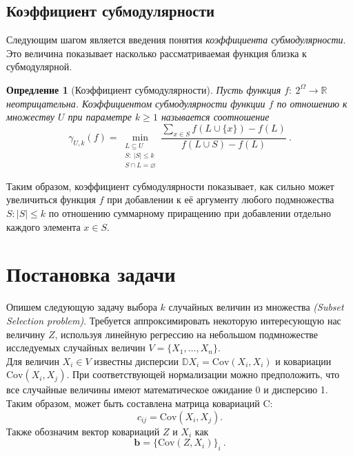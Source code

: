 \documentclass[preprint,12pt]{elsarticle}
\newtheorem{definition}{Опредление}
\newtheorem{theorem}{Теорема}
\begin{document}

\subsection{Коэффициент субмодулярности}

Следующим шагом является введения понятия \textit{коэффициента субмодулярности}. Это величина показывает насколько рассматриваемая функция близка к субмодулярной.  

\begin{definition}[Коэффициент субмодулярности]

Пусть функция $f:~2^\Omega \rightarrow \mathbb{R}$ неотрицательна. Коэффициентом субмодулярности функции $f$ по отношению к множеству $U$ при параметре $k \geqslant 1$ называется соотношение
\[\gamma_{U, k}(f)=\min\limits_{\substack{L\subseteq U \\ 
                                          S:~|S| \leqslant k \\ 
                                          S \cap L=\varnothing}} \frac{\sum\limits_{x \in S} f(L \cup\{x\})-f(L)}{f(L \cup S)-f(L)}~.\]
\end{definition}

Таким образом, коэффициент субмодулярности показывает, как сильно может увеличиться функция $f$ при добавлении к её аргументу любого подмножества $S: |S|\leqslant k$ по отношению суммарному приращению при добавлении отдельно каждого элемента $x \in S$.

\section{Постановка задачи}

\label{S:2}
Опишем следующую задачу выбора $k$ случайных величин из множества \textit{(Subset Selection problem)}. Требуется аппроксимировать некоторую интересующую нас величину $Z$, используя линейную регрессию на небольшом подмножестве исследуемых случайных величин $V=\{X_1,\dots, X_n\}$.\\

Для величин $X_i \in V$ известны дисперсии $\mathbb{D}X_i = \mathrm{Cov}(X_i, X_i)$ и ковариации $\mathrm{Cov}(X_i, X_j)$. 
При соответствующей нормализации можно предположить, что все случайные величины имеют математическое ожидание 0 и дисперсию 1. 
Таким образом, может быть составлена матрица ковариаций C:
\[c_{ij} = \mathrm{Cov}(X_i, X_j).\] 
Также обозначим вектор ковариаций $Z$ и $X_i$ как 
\[\textbf{b}= \{\mathrm{Cov}(Z, X_i)\}_i~.\] 
\end{document}
